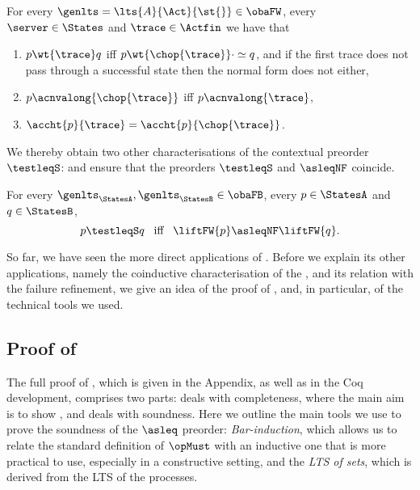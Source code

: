 \begin{lemma}
  \label{lem:normalisation-preserves-predicates}
  For every $\genlts = \lts{A}{\Act}{\st{}} \in \obaFW$, every $\server \in \States$ and $\trace \in \Actfin$ we have that
  \begin{enumerate}
  \item %
    $ p \wt{ \trace } q$ iff $ p \wt{ \chop{\trace} } \cdot \simeq q$,
    and if the first trace does not pass through a successful state then the normal form does not either,
  \item %
    $ p \acnvalong{\chop{\trace} }$ iff $ p \acnvalong{ \trace }$,
  \item %
    $ \accht{p}{ \trace } = \accht{p}{ \chop{\trace} }$.
  \end{enumerate}
\end{lemma}
\noindent

We thereby obtain two other characterisations of the contextual preorder~$\testleqS$:
 and  ensure that the
preorders $\testleqS$ and $\asleqNF$ coincide.
\begin{corollary}%
  \label{cor:asynleq-equals-bhvleq}
  For every $\genlts_\StatesA, \genlts_\StatesB \in \obaFB$,
  every $\serverA \in \StatesA$ and $\serverB \in \StatesB$,
  \[
    \serverA \testleqS \serverB \;\;\;\text{iff}\;\;\;
  \liftFW{\serverA} \asleqNF \liftFW{\serverB}.
  \]
\end{corollary}

So far, we have seen the more direct applications of
. Before we explain its other applications, namely
the coinductive characterisation of the \mustpreorder, and its relation with the
failure refinement, we give an idea of the proof of ,
and, in particular, of the technical tools we used.

\subsection{Proof of }

The full proof of , which is given in the Appendix,
as well as in the Coq development, comprises two parts:
 deals with completeness, where the main aim is to show
, and  deals with soundness.
%
Here we outline the main tools we use to prove the soundness of the
$\asleq$ preorder: \emph{Bar-induction}, which allows us to relate the standard
definition of $\opMust$ with an inductive one that is more practical to use,
especially in a constructive setting, and the \emph{LTS of sets}, which is
derived from the LTS of the processes.


